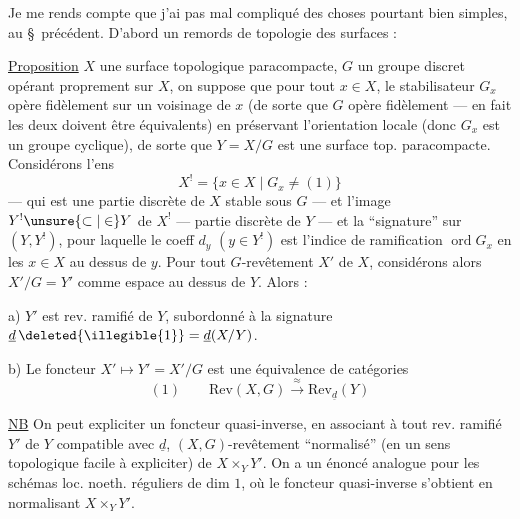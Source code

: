 Je me rends compte que j'ai pas mal compliqué des choses pourtant bien
simples, au \S\ précédent. D'abord un remords de topologie des surfaces :

\uline{Proposition} 
$X$ une surface topologique\unsure{${}^{*}$} paracompacte,
$G$ un groupe discret opérant proprement sur $X$, on suppose que pour tout
$x\in X$, le stabilisateur $G_x$ opère fidèlement sur un voisinage de $x$
(de sorte que $G$ opère fidèlement --- en fait les deux doivent être
équivalents) en préservant l'orientation locale (donc $G_x$ est
un groupe cyclique), de sorte que $Y=X/G$ est une surface top. paracompacte.
Considérons l'ens
\[
X^{!}=\{x\in X\mid G_x\ne(1)\}
\]
--- qui est une partie discrète de $X$ stable sous $G$ --- et l'image
$Y^{!}\unsure{\subset|\in}Y$ de $X^{!}$ --- partie discrète de $Y$ --- et
la ``signature'' sur $(Y,Y^{!})$, pour laquelle le coeff $d_y$ $(y\in Y^{!})$
est l'indice de ramification $\operatorname{ord}G_x$ en les
$x\in X$ au dessus de $y$. Pour tout $G$-revêtement $X'$ de $X$, considérons
alors $X'/G=Y'$ comme espace au dessus de $Y$. Alors :


a) $Y'$ est   rev. ramifié de $Y$, subordonné à la signature $\underline d\,\deleted{\illegible{1}}=\underline d(X/Y)$.

b) Le foncteur $X'\longmapsto Y'=X'/G$ est une équivalence de catégories
\[
(1)\qquad \mathrm{Rev}(X,G)\overset{\approx}{\longrightarrow}\mathrm{Rev}_{\underline d}(Y)
\]

\uline{NB} On peut expliciter un foncteur quasi-inverse, en associant à tout rev. ramifié $Y'$ de $Y$ compatible avec $\underline d$,   $(X,G)$-revêtement ``normalisé'' (en un sens topologique facile à expliciter) de $X\times_Y Y'$. On a un énoncé analogue pour les schémas loc. noeth. réguliers de dim $1$, où le foncteur quasi-inverse s'obtient en normalisant $X\times_Y Y'$.

